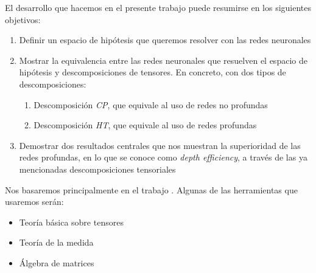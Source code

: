 El desarrollo que hacemos en el presente trabajo puede resumirse en los siguientes objetivos:

\begin{enumerate}
    \item Definir un espacio de hipótesis que queremos resolver con las redes neuronales
    \item Mostrar la equivalencia entre las redes neuronales que resuelven el espacio de hipótesis y descomposiciones de tensores. En concreto, con dos tipos de descomposiciones:
        \begin{enumerate}
            \item Descomposición \textit{CP}, que equivale al uso de redes no profundas
            \item Descomposición \textit{HT}, que equivale al uso de redes profundas
        \end{enumerate}

    \item Demostrar dos resultados centrales que nos muestran la superioridad de las redes profundas, en lo que se conoce como \textit{depth efficiency}, a través de las ya mencionadas descomposiciones tensoriales
\end{enumerate}

Nos basaremos principalmente en el trabajo \cite{matematicas:principal}. Algunas de las herramientas que usaremos serán:

\begin{itemize}
    \item Teoría básica sobre tensores
    \item Teoría de la medida
    \item Álgebra de matrices
\end{itemize}

\endinput
